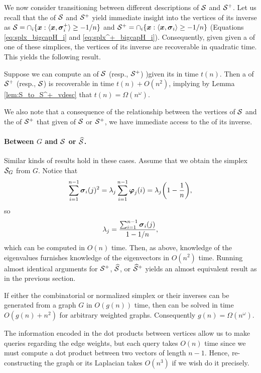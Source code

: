  We now consider transitioning between different descriptions of $\mathcal{S}$ and $\mathcal{S}^+$. Let us recall that the \hdesc of $\mathcal{S}$ and $\mathcal{S}^+$ yield immediate insight into the vertices of its inverse as $\mathcal{S}=\cap_i \{\vb*{x}:\langle \vb*{x},\vb*{\sigma}_i^+\rangle \geq -1/n\}$ and $\mathcal{S}^+=\cap_i\{\vb*{x}:\langle\vb*{x},\vb*{\sigma}_i\rangle \geq -1/n\}$ (Equations \eqref{eq:splx_bigcapH_i} and \eqref{eq:splx^+_bigcapH_i}). Consequently, given given a \hdesc of one of these simplices, the vertices of its inverse are recoverable in quadratic time. This yields the following result. 
 
 \begin{lemma}
 	\label{lem:S_vdesc_to_hdesc}
	 Suppose we can compute an \hdesc of $\mathcal{S}$ (resp., $\mathcal{S}^+$) )given its \vdesc in time $t(n)$. Then a \vdesc of $\mathcal{S}^+$ (resp., $\mathcal{S}$) is recoverable in time $t(n) + O(n^2)$, implying by Lemma \ref{lem:S_to_S^+_vdesc} that $t(n) = \Omega(n^\omega)$. 
 \end{lemma}

We also note that a consequence of the relationship between the vertices of $\mathcal{S}$ and the \hdesc of $\mathcal{S}^+$ that given \vdesc of $\mathcal{S}$ or $\mathcal{S}^+$, we have immediate access to the \hdesc of its inverse. 


\paragraph{Between \texorpdfstring{$G$}{the graph} and \texorpdfstring{$\mathcal{S}$ or $\widehat{\mathcal{S}}$}{its simplices}.}
Similar kinds of results hold  in these cases. Assume that we obtain  the simplex $\mathcal{S}_G$ from $G$. Notice  that \[\sum_{i=1}^{n-1}   \vb*{\sigma}_i(j)^2 = \lambda_j \sum_{i=1}^{n-1} \vb*{\varphi}_j(i) = \lambda_j\bigg(1-\frac{1}{n}\bigg),\]
so 
\[\lambda_j = \frac{\sum_{i=1}^{n-1}\vb*{\sigma}_i(j)}{1-1/n},\]
which can be computed  in $O(n)$  time. Then, as above, knowledge of the eigenvalues furnishes knowledge  of the eigenvectors in $O(n^2)$ time. Running almost identical arguments for $\mathcal{S}^+$, $\widehat{\mathcal{S}}$, or $\widehat{\mathcal{S}}^+$ yields an almost equivalent result as in the previous section.  

\begin{lemma}
	\label{lem:G_to_S_and_Sn}
	If either the combinatorial or normalized simplex or their  inverses can be generated from a graph $G$ in $O(g(n))$ time, then \lapdecomp can be solved in time $O(g(n) + n^2)$ for arbitrary weighted graphs. Consequently $g(n) = \Omega(n^\omega)$. 
\end{lemma}

The information encoded in the dot products between vertices allow us to make queries regarding the edge weights, but  each query takes $O(n)$ time since we must compute a dot product between two vectors of length $n-1$. Hence, re-constructing the graph or its Laplacian takes $O(n^3)$ if we wish do it precisely. 

